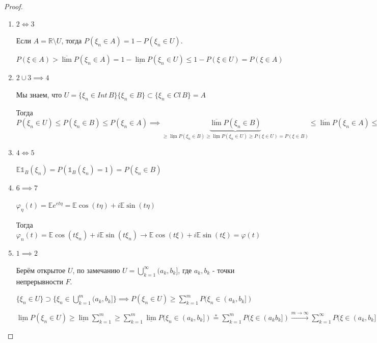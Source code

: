 \begin{proof}
    \begin{enumerate}
        \item {
            $2 \Longleftrightarrow 3$
            
            Если $A = \mathbb{R} \setminus U$, тогда $P(\xi_n \in A) = 1 - P(\xi_n \in U)$.

            $P(\xi \in A) > \overline{\lim} P(\xi_n \in A) = 1 - \underline{\lim} P(\xi_n \in U) \leqslant 1 - P(\xi \in U) = P(\xi \in A)$
        }
        \item {
            $2 \cup 3 \implies 4$
            
            Мы знаем, что $U = \{ \xi_n \in Int \, B \} \{ \xi_n \in B \} \subset \{ \xi_n \in Cl \, B \} = A$

            Тогда $P(\xi_n \in U) \leqslant P(\xi_n \in B) \leqslant P(\xi_n \in A) \implies \underbrace{\overline{\lim} P(\xi_n \in B)}_{\geqslant \underline{\lim} P(\xi_n \in B) \geqslant \underline{\lim} P(\xi_n \in U) \geqslant P(\xi \in U) = P(\xi \in B)} \leqslant \overline{\lim} P(\xi_n \in A) \leqslant P(\xi \in A) = P(\xi \in B)$
        }
        \item {
            $4 \Longleftrightarrow 5$

            $\mathbb{E} \mathds{1}_B (\xi_n) = P(\mathds{1}_B (\xi_n) = 1) = P(\xi_n \in B)$ 
        }
        \item {
            $6 \implies 7$

            $\varphi_{\eta} (t) = \mathbb{E} e^{et\eta} = \mathbb{E} \cos (t\eta) + i \mathbb{E} \sin (t \eta)$

            Тогда $\varphi_n(t) = \mathbb{E} \cos (t \xi_n) + i\mathbb{E} \sin (t\xi_n) \rightarrow \mathbb{E} \cos (t\xi) + i \mathbb{E} \sin (t\xi) = \varphi (t)$
        }
        \item {
            $1 \implies 2$

            Берём открытое $U$, по замечанию $U =  \bigcup\limits_{k = 1}^{\infty} (a_k, b_k]$, где $a_k, b_k$ - точки непрерывности $F$. 

            $\{ \xi_n \in U \} \supset \{ \xi_n \in \bigcup\limits_{k = 1}^{m} (a_k, b_k] \} \implies P(\xi_n \in U) \geqslant \sum_{k = 1}^m P(\xi_n \in (a_k, b_k])$

            $\underline{\lim} P(\xi_n \in U) \geqslant \underline{\lim} \sum_{k  = 1}^m \geqslant \sum_{k = 1}^m \underline{\lim} P(\xi_n \in (a_k, b_k]) \overset{*}{=} \sum_{k = 1}^m P(\xi \in (a_k b_k]) \overset{m \to \infty}{\rightarrow} \sum_{k = 1}^{\infty} P(\xi \in (a_k, b_k]) = P(\xi \in U)$

}
\end{enumerate}
\end{proof}
